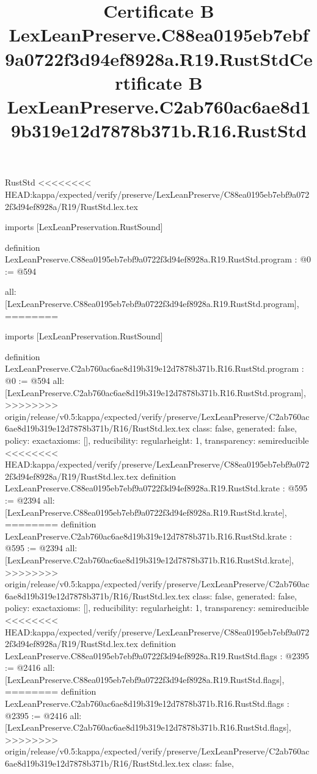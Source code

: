 \begin{lexlean}{RustStd}
<<<<<<<< HEAD:kappa/expected/verify/preserve/LexLeanPreserve/C88ea0195eb7ebf9a0722f3d94ef8928a/R19/RustStd.lex.tex
\title{Certificate B LexLeanPreserve.C88ea0195eb7ebf9a0722f3d94ef8928a.R19.RustStd}
\begin{coremodule}
imports [LexLeanPreservation.RustSound]

definition LexLeanPreserve.C88ea0195eb7ebf9a0722f3d94ef8928a.R19.RustStd.program : @0 := @594 {
  all: [LexLeanPreserve.C88ea0195eb7ebf9a0722f3d94ef8928a.R19.RustStd.program],
========
\title{Certificate B LexLeanPreserve.C2ab760ac6ae8d19b319e12d7878b371b.R16.RustStd}
\begin{coremodule}
imports [LexLeanPreservation.RustSound]

definition LexLeanPreserve.C2ab760ac6ae8d19b319e12d7878b371b.R16.RustStd.program : @0 := @594 {
  all: [LexLeanPreserve.C2ab760ac6ae8d19b319e12d7878b371b.R16.RustStd.program],
>>>>>>>> origin/release/v0.5:kappa/expected/verify/preserve/LexLeanPreserve/C2ab760ac6ae8d19b319e12d7878b371b/R16/RustStd.lex.tex
  class: false,
  generated: false,
  policy: exact{axioms: []},
  reducibility: regular{height: 1},
  transparency: semireducible
}
<<<<<<<< HEAD:kappa/expected/verify/preserve/LexLeanPreserve/C88ea0195eb7ebf9a0722f3d94ef8928a/R19/RustStd.lex.tex
definition LexLeanPreserve.C88ea0195eb7ebf9a0722f3d94ef8928a.R19.RustStd.krate : @595 := @2394 {
  all: [LexLeanPreserve.C88ea0195eb7ebf9a0722f3d94ef8928a.R19.RustStd.krate],
========
definition LexLeanPreserve.C2ab760ac6ae8d19b319e12d7878b371b.R16.RustStd.krate : @595 := @2394 {
  all: [LexLeanPreserve.C2ab760ac6ae8d19b319e12d7878b371b.R16.RustStd.krate],
>>>>>>>> origin/release/v0.5:kappa/expected/verify/preserve/LexLeanPreserve/C2ab760ac6ae8d19b319e12d7878b371b/R16/RustStd.lex.tex
  class: false,
  generated: false,
  policy: exact{axioms: []},
  reducibility: regular{height: 1},
  transparency: semireducible
}
<<<<<<<< HEAD:kappa/expected/verify/preserve/LexLeanPreserve/C88ea0195eb7ebf9a0722f3d94ef8928a/R19/RustStd.lex.tex
definition LexLeanPreserve.C88ea0195eb7ebf9a0722f3d94ef8928a.R19.RustStd.flags : @2395 := @2416 {
  all: [LexLeanPreserve.C88ea0195eb7ebf9a0722f3d94ef8928a.R19.RustStd.flags],
========
definition LexLeanPreserve.C2ab760ac6ae8d19b319e12d7878b371b.R16.RustStd.flags : @2395 := @2416 {
  all: [LexLeanPreserve.C2ab760ac6ae8d19b319e12d7878b371b.R16.RustStd.flags],
>>>>>>>> origin/release/v0.5:kappa/expected/verify/preserve/LexLeanPreserve/C2ab760ac6ae8d19b319e12d7878b371b/R16/RustStd.lex.tex
  class: false,
}}}
\end{coremodule}}
\end{coremodule}
\end{lexlean}
